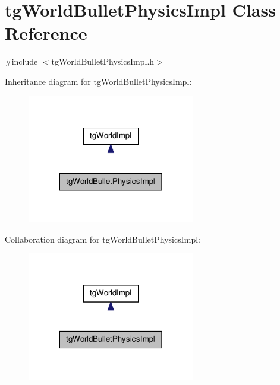 \hypertarget{classtg_world_bullet_physics_impl}{\section{tg\-World\-Bullet\-Physics\-Impl Class Reference}
\label{classtg_world_bullet_physics_impl}
}


{\ttfamily \#include $<$tg\-World\-Bullet\-Physics\-Impl.\-h$>$}



Inheritance diagram for tg\-World\-Bullet\-Physics\-Impl\-:\nopagebreak
\begin{figure}[H]
\begin{center}
\leavevmode
\includegraphics[width=208pt]{classtg_world_bullet_physics_impl__inherit__graph}
\end{center}
\end{figure}


Collaboration diagram for tg\-World\-Bullet\-Physics\-Impl\-:\nopagebreak
\begin{figure}[H]
\begin{center}
\leavevmode
\includegraphics[width=208pt]{classtg_world_bullet_physics_impl__coll__graph}
\end{center}
\end{figure}

